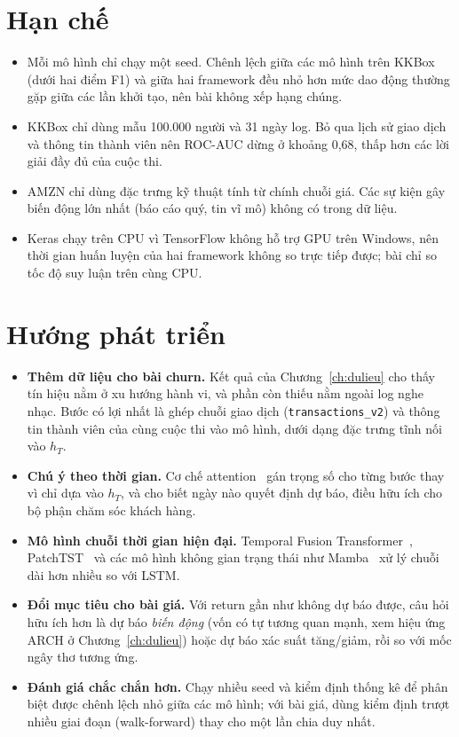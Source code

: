 \section{Hạn chế}

\begin{itemize}
  \item Mỗi mô hình chỉ chạy một seed. Chênh lệch giữa các mô hình trên KKBox (dưới hai điểm F1) và giữa hai framework
        đều nhỏ hơn mức dao động thường gặp giữa các lần khởi tạo, nên bài không xếp hạng chúng.
  \item KKBox chỉ dùng mẫu 100.000 người và 31 ngày log. Bỏ qua lịch sử giao dịch và thông tin thành viên nên ROC-AUC dừng
        ở khoảng 0,68, thấp hơn các lời giải đầy đủ của cuộc thi.
  \item AMZN chỉ dùng đặc trưng kỹ thuật tính từ chính chuỗi giá. Các sự kiện gây biến động lớn nhất (báo cáo quý, tin vĩ
        mô) không có trong dữ liệu.
  \item Keras chạy trên CPU vì TensorFlow không hỗ trợ GPU trên Windows, nên thời gian huấn luyện của hai framework không
        so trực tiếp được; bài chỉ so tốc độ suy luận trên cùng CPU.
\end{itemize}

\section{Hướng phát triển}

\begin{itemize}
  \item \textbf{Thêm dữ liệu cho bài churn.} Kết quả của Chương~\ref{ch:dulieu} cho thấy tín hiệu nằm ở xu hướng hành vi,
        và phần còn thiếu nằm ngoài log nghe nhạc. Bước có lợi nhất là ghép chuỗi giao dịch (\texttt{transactions\_v2})
        và thông tin thành viên của cùng cuộc thi vào mô hình, dưới dạng đặc trưng tĩnh nối vào $h_T$.
  \item \textbf{Chú ý theo thời gian.} Cơ chế attention~\cite{vaswani2017} gán trọng số cho từng bước thay vì chỉ dựa vào
        $h_T$, và cho biết ngày nào quyết định dự báo, điều hữu ích cho bộ phận chăm sóc khách hàng.
  \item \textbf{Mô hình chuỗi thời gian hiện đại.} Temporal Fusion Transformer~\cite{lim2021}, PatchTST~\cite{nie2023}
        và các mô hình không gian trạng thái như Mamba~\cite{gu2023} xử lý chuỗi dài hơn nhiều so với LSTM.
  \item \textbf{Đổi mục tiêu cho bài giá.} Với return gần như không dự báo được, câu hỏi hữu ích hơn là dự báo
        \emph{biến động} (vốn có tự tương quan mạnh, xem hiệu ứng ARCH ở Chương~\ref{ch:dulieu}) hoặc dự báo xác suất
        tăng/giảm, rồi so với mốc ngây thơ tương ứng.
  \item \textbf{Đánh giá chắc chắn hơn.} Chạy nhiều seed và kiểm định thống kê để phân biệt được chênh lệch nhỏ giữa các
        mô hình; với bài giá, dùng kiểm định trượt nhiều giai đoạn (walk-forward) thay cho một lần chia duy nhất.
\end{itemize}
